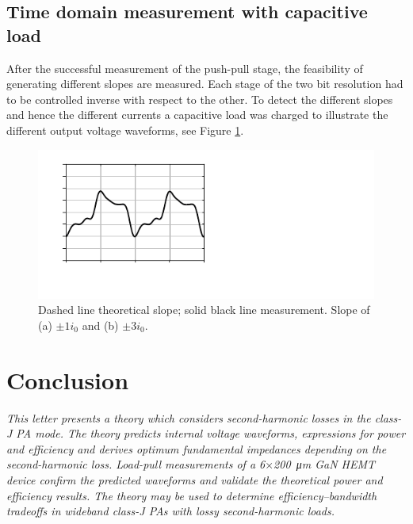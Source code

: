 \documentclass[journal]{IEEEtran}
\begin{document}
\subsection{Time domain measurement with capacitive load}
After the successful measurement of the push-pull stage, the feasibility of generating different slopes are measured.
Each stage of the two bit resolution had to be controlled inverse with respect to the other.
To detect the different slopes and hence the different currents a capacitive load was charged to illustrate the different output voltage waveforms, see Figure \ref{fig:meas_Output_CLoad_100M_1io_3io}.

\begin{figure}[htb]
  \centering
  \includegraphics{meas_Output_CLoad_100M_1i0_3i0}
  \caption{
    Dashed line theoretical slope; solid black line measurement. Slope of (a) $\pm 1  i_0$ and (b) $\pm 3 i_0$.}
  \label{fig:meas_Output_CLoad_100M_1io_3io}
\end{figure}


\section{Conclusion}
\label{sec:conclusion}
{\itshape
This letter presents a theory which considers second-harmonic losses in the
class-J PA mode. The theory predicts internal voltage waveforms, expressions
for power and efficiency and derives optimum fundamental impedances depending
on the second-harmonic loss. Load-pull measurements of a
6$\times$\SI{200}{\micro\meter} GaN HEMT device confirm the predicted waveforms
and validate the theoretical power and efficiency results. The theory may be
used to determine efficiency--bandwidth tradeoffs in wideband class-J PAs with
lossy second-harmonic loads.

}
\end{document}
